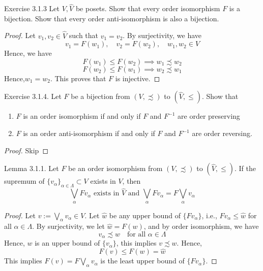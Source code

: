 \begin{frame}{Exercise 3.1.3}
Let $V,\hat V$ be posets. Show that every order isomorphism $F$ is a bijection. Show that every order anti-isomorphism is also a bijection.
\begin{proof}
    Let $v_1,v_2\in \hat V$ such that $v_1 = v_2$. By surjectivity, we have
    $$
    v_1 = F(w_1), \quad v_2=F(w_2),\quad w_1,w_2\in V
    $$
    Hence, we have
    $$
    F(w_1)\le F(w_2) \implies w_1\precsim w_2
    $$
    $$
    F(w_2) \le F(w_1)\implies w_2\precsim w_1
    $$
    Hence,$w_1 = w_2$. This proves that $F$ is injective. 
\end{proof}
    
\end{frame}

\begin{frame}{Exercise 3.1.4.}
Let $F$ be a bijection from $(V,\precsim)$ to $(\hat V, \le)$. Show that
\begin{enumerate}
    \item $F$ is an order isomorphism if and only if $F$ and $F^{-1}$ are order preserving
    \item $F$ is an order anti-isomorphism if and only if $F$ and $F^{-1}$ are order reversing.
\end{enumerate}
\begin{proof}
    Skip
\end{proof}
\end{frame}

\begin{frame}{Lemma 3.1.1.}
Let $F$ be an order isomorphism from $(V,\precsim)$ to $(\hat V, \le)$. If the supremum of $\{v_\alpha\}_{\alpha\in \Lambda}\subset V$ exists in $V$, then
$$
\bigvee_{\alpha} Fv_\alpha \text{ exists in $\hat V$ and $\bigvee_\alpha Fv_\alpha = F\bigvee_\alpha v_\alpha$}
$$
\begin{proof}
    Let $v:= \bigvee_\alpha v_\alpha \in V$. Let $\hat w$ be any upper bound of $\{Fv_\alpha\}$, i.e., $Fv_\alpha \le \hat w$ for all $\alpha \in\Lambda$. By surjectivity, we let $\hat w = F(w)$, and by order isomorphism, we have
    $$
    v_\alpha \precsim w \quad \text{for all $\alpha\in\Lambda$}
    $$
    Hence, $w$ is an upper bound of $\{v_\alpha\}$, this implies $v\precsim w$. Hence, 
    $$
    F(v) \le F(w) =\hat w
    $$
    This implies $F(v)= F\bigvee_\alpha v_\alpha$ is the least upper bound of $\{Fv_\alpha\}$. 
\end{proof}
\end{frame}

